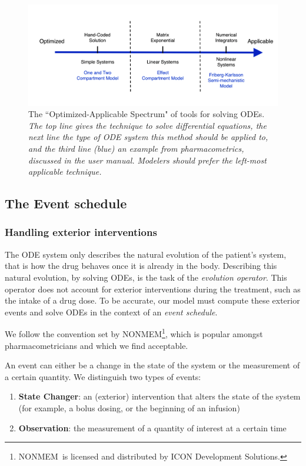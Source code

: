 \documentclass[11pt]{article}
\begin{document}
\begin{figure}[!htb]
\begin{center}
\includegraphics[width=5in,trim=0in 0in 0 0in]{graphics/ODEsolvers_ext.png}
\caption{{The ``Optimized-Applicable Spectrum" of tools for solving ODEs. \textit{The top 
line gives the technique to solve differential equations, the next line the type of ODE 
system this method should be applied to, and the third line (blue) an example from 
pharmacometrics, discussed in the user manual. Modelers should prefer the left-most 
applicable technique.}}}
\label{DiffEqTools}
\end{center}
\end{figure}

\subsection{The Event schedule}

\subsubsection{Handling exterior interventions}

The ODE system only describes the natural evolution of the patient's system, that is 
how the drug behaves once it is already in the body. Describing this natural evolution, 
by solving ODEs, is the task of the \textit{evolution operator}. This operator does not 
account for exterior interventions during the treatment, such as the intake of a drug 
dose. To be accurate, our model must compute these exterior events and solve ODEs
in the context of an \textit{event schedule}.

We follow the convention set by NONMEM\textregistered\footnote{NONMEM\textregistered\ 
is licensed and distributed by ICON Development Solutions.}, which is popular amongst 
pharmacometricians and which we find acceptable.

An event can either be a change in the state of the system or the measurement of a certain 
quantity. We distinguish two types of events:
\begin{enumerate}
  \item \textbf{State Changer}: an (exterior) intervention that alters the state of the 
  system (for example, a bolus dosing, or the beginning of an infusion)
  \item \textbf{Observation}: the measurement of a quantity of interest at a certain time
\end{enumerate}
\end{document}
